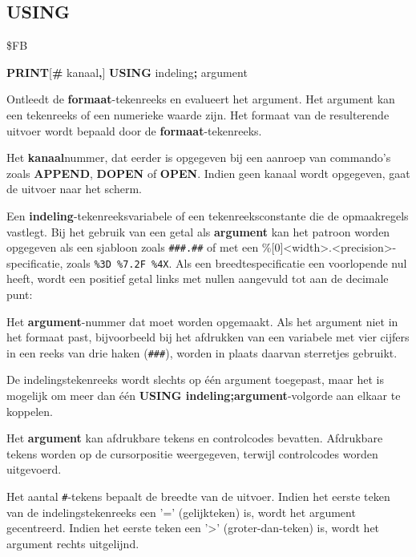 \subsection{USING}
\begin{description}[leftmargin=2cm,style=nextline]
\item [Token:]    \$FB

\item [Formaat:]   {\bf PRINT}[{\bf\#} kanaal{\bf,}] {\bf USING} indeling{\bf;} argument

\item [Gebruik:]    Ontleedt de {\bf formaat}-tekenreeks en evalueert het argument. Het argument kan een tekenreeks of een numerieke waarde zijn. Het formaat van de resulterende uitvoer wordt bepaald door de {\bf formaat}-tekenreeks.

                  Het {\bf kanaal}nummer, dat eerder is opgegeven bij een aanroep van commando's zoals {\bf APPEND}, {\bf DOPEN} of {\bf OPEN}. Indien geen kanaal wordt opgegeven, gaat de uitvoer naar het scherm.

Een {\bf indeling}-tekenreeksvariabele of een tekenreeksconstante die de opmaakregels vastlegt. Bij het gebruik van een getal als {\bf argument} kan het patroon worden opgegeven als een sjabloon zoals \texttt{\#\#\#.\#\#} of met een \%[0]<width>.<precision>-specificatie, zoals \texttt{\%3D \%7.2F \%4X}. Als een breedtespecificatie een voorlopende nul heeft, wordt een positief getal links met nullen aangevuld tot aan de decimale punt: 

                  Het {\bf argument}-nummer dat moet worden opgemaakt. Als het argument niet in het formaat past, bijvoorbeeld bij het afdrukken van een variabele met vier cijfers in een reeks van drie haken (\texttt{\#\#\#}), worden in plaats daarvan sterretjes gebruikt.

\item [Opmerkingen:]  De indelingstekenreeks wordt slechts op één argument toegepast, maar het is mogelijk om meer dan één {\bf USING indeling;argument}-volgorde aan elkaar te koppelen.

                  Het {\bf argument} kan afdrukbare tekens en controlcodes bevatten. Afdrukbare tekens worden op de cursorpositie weergegeven, terwijl controlcodes worden uitgevoerd.

                  Het aantal \texttt{\#}-tekens bepaalt de breedte van de uitvoer. Indien het eerste teken van de indelingstekenreeks een '=' (gelijkteken) is, wordt het argument gecentreerd. Indien het eerste teken een '>' (groter-dan-teken) is, wordt het argument rechts uitgelijnd.


\end{description}

